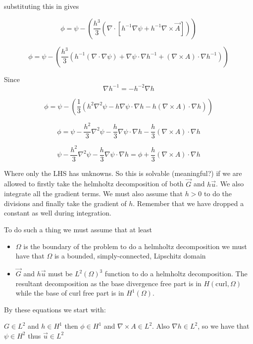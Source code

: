\documentclass[12pt]{article}
\begin{document}
substituting this in gives

\[\phi = \psi - \left(\frac{h^3}{3} \left(\nabla \cdot \left[h^{-1} \nabla \psi + h^{-1}\nabla \times \vec{A}\right]\right)\right)\]

\[\phi = \psi - \left(\frac{h^3}{3} \left(h^{-1} \left(\nabla \cdot \nabla \psi\right) + \nabla \psi \cdot \nabla h^{-1} + \left(\nabla \times A\right)\cdot\nabla h^{-1}\right)\right)\]

Since 
\[\nabla h^{-1} = -h^{-2}\nabla h\]

\[\phi = \psi - \left(\frac{1}{3} \left(h^2 \nabla^2 \psi - h\nabla \psi \cdot \nabla h -h \left(\nabla \times A\right)\cdot\nabla h\right)\right)\]

\[\phi = \psi - \frac{h^2}{3} \nabla^2 \psi - \frac{h}{3}\nabla \psi \cdot \nabla h - \frac{h}{3} \left(\nabla \times A\right)\cdot\nabla h\]

\[\psi - \frac{h^2}{3} \nabla^2 \psi - \frac{h}{3}\nabla \psi \cdot \nabla h = \phi + \frac{h}{3} \left(\nabla \times A\right)\cdot\nabla h\]

Where only the LHS has unknowns. So this is solvable (meaningful?) if we are allowed to firstly take the helmholtz decomposition of both $\vec{G}$ and $h\vec{u}$. We also integrate all the gradient terms. We must also assume that $h > 0$ to do the divisions and finally take the gradient of $h$. Remember that we have dropped a constant as well during integration.  

To do such a thing we must assume that at least
\begin{itemize}
\item{$\Omega$ is the boundary of the problem to do a helmholtz decomposition we must have that $\Omega$ is a bounded, simply-connected, Lipschitz domain}
\item{$\vec{G}$ and $h\vec{u}$ must be $L^2\left(\Omega\right)^3$ function to do a helmholtz decomposition. The resultant decomposition as the base divergence free part is in $H(\text{curl},\Omega)$ while the base of curl free part is in $H^1\left(\Omega\right)$.}
\end{itemize}

By these equations we start with:

$G \in L^2$ and $h \in H^1$ then $\phi \in H^1$ and $\nabla \times A \in L^2$. Also $\nabla h \in L^2$, so we have that $\psi \in H^2$ thus $\vec{u} \in L^2$
\end{document}
